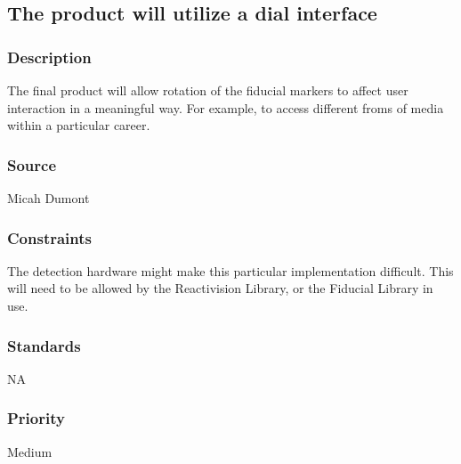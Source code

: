 \subsection{The product will utilize a dial interface}
\subsubsection{Description}
The final product will allow rotation of the fiducial markers to affect user interaction in a meaningful way. For example, to access different froms of media within a particular career.
\subsubsection{Source}
Micah Dumont
\subsubsection{Constraints}
The detection hardware might make this particular implementation difficult. This will need to be allowed by the Reactivision Library, or the Fiducial Library in use.
\subsubsection{Standards}
NA
\subsubsection{Priority}
Medium